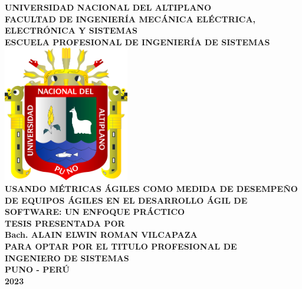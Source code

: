 \textbf{\Large UNIVERSIDAD NACIONAL DEL ALTIPLANO}\\
\vspace{0.5cm}
\textbf{\Large FACULTAD DE INGENIERÍA MECÁNICA ELÉCTRICA, ELECTRÓNICA Y SISTEMAS}\\
\vspace{0.5cm}
\textbf{\large ESCUELA PROFESIONAL DE INGENIERÍA DE SISTEMAS}\\
\vspace{1cm}
\includegraphics[width=5.5cm]{chapters/utils/logo-unap.png}\\
\vspace{1cm}
\textbf{\large USANDO MÉTRICAS ÁGILES COMO MEDIDA DE DESEMPEÑO DE EQUIPOS ÁGILES EN EL DESARROLLO ÁGIL DE SOFTWARE: UN ENFOQUE PRÁCTICO}\\
\vspace{0.8cm}
\textbf{\large TESIS PRESENTADA POR}\\
\vspace{0.8cm}
\textbf{\Large Bach. ALAIN ELWIN ROMAN VILCAPAZA}\\
\vspace{0.8cm}
\textbf{\large PARA OPTAR POR EL TITULO PROFESIONAL DE}\\
\vspace{0.8cm}
\textbf{\Large INGENIERO DE SISTEMAS}\\
\vspace{0.8cm}
\textbf{\large PUNO - PERÚ}\\
\vspace{0.8cm}
\textbf{\large 2023}\\